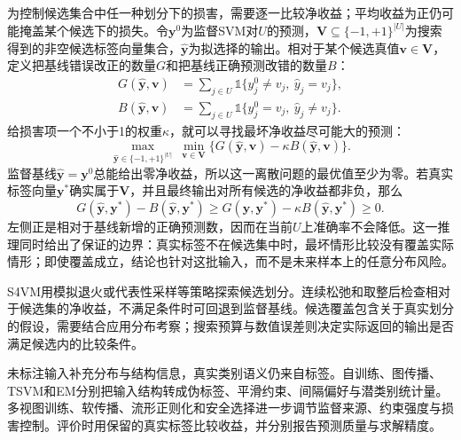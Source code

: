 为控制候选集合中任一种划分下的损害，需要逐一比较净收益；平均收益为正仍可能掩盖某个候选下的损失。令$\bm{y}^{0}$为监督SVM对$U$的预测，$\bm{V}\subseteq\{-1,+1\}^{|U|}$为搜索得到的非空候选标签向量集合，$\widehat{\bm{y}}$为拟选择的输出。相对于某个候选真值$\bm{v}\in\bm{V}$，定义把基线错误改正的数量$G$和把基线正确预测改错的数量$B$：
\begin{equation}
  \label{eq:classification-s4vm-gain-loss}
  \begin{aligned}
    G(\widehat{\bm{y}},\bm{v})
      &=\sum_{j\in U}
        \mathbb{1}\{y_j^0\ne v_j,\ \widehat y_j=v_j\},\\
    B(\widehat{\bm{y}},\bm{v})
      &=\sum_{j\in U}
        \mathbb{1}\{y_j^0=v_j,\ \widehat y_j\ne v_j\}.
  \end{aligned}
\end{equation}
给损害项一个不小于1的权重$\kappa$，就可以寻找最坏净收益尽可能大的预测：
\begin{equation}
  \label{eq:classification-s4vm-maxmin}
  \max_{\widehat{\bm{y}}\in\{-1,+1\}^{|U|}}
  \ \min_{\bm{v}\in\bm{V}}
  \bigl\{G(\widehat{\bm{y}},\bm{v})
         -\kappa B(\widehat{\bm{y}},\bm{v})\bigr\}.
\end{equation}
监督基线$\widehat{\bm{y}}=\bm{y}^{0}$总能给出零净收益，所以这一离散问题的最优值至少为零。若真实标签向量$\bm{y}^{\ast}$确实属于$\bm{V}$，并且最终输出对所有候选的净收益都非负，那么
\[
  G(\widehat{\bm{y}},\bm{y}^{\ast})
    -B(\widehat{\bm{y}},\bm{y}^{\ast})
  \geq
  G(\widehat{\bm{y}},\bm{y}^{\ast})
    -\kappa B(\widehat{\bm{y}},\bm{y}^{\ast})
  \geq0.
\]
左侧正是相对于基线新增的正确预测数，因而在当前$U$上准确率不会降低。这一推理同时给出了保证的边界：真实标签不在候选集中时，最坏情形比较没有覆盖实际情形；即使覆盖成立，结论也针对这批输入，而不是未来样本上的任意分布风险。

S4VM用模拟退火或代表性采样等策略探索候选划分。连续松弛和取整后检查相对于候选集的净收益，不满足条件时可回退到监督基线。候选覆盖包含关于真实划分的假设，需要结合应用分布考察；搜索预算与数值误差则决定实际返回的输出是否满足候选内的比较条件。

未标注输入补充分布与结构信息，真实类别语义仍来自标签。自训练、图传播、TSVM和EM分别把输入结构转成伪标签、平滑约束、间隔偏好与潜类别统计量。多视图训练、软传播、流形正则化和安全选择进一步调节监督来源、约束强度与损害控制。评价时用保留的真实标签比较收益，并分别报告预测质量与求解精度。